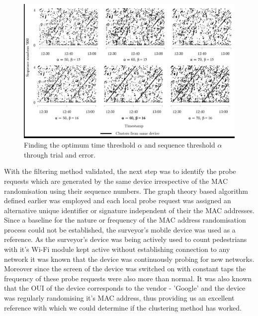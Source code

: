 \begin{figure}
  \includegraphics[trim={1 1 1 1},clip]{images/processing-oxst-clusters.jpg}
  \caption{Finding the optimum time threshold $\alpha$ and sequence threshold $\alpha$ through trial and error.}
  \label{figure:processing:oxst:clusters}
\end{figure}

With the filtering method validated, the next step was to identify the probe requests which are generated by the same device irrespective of the MAC randomisation using their sequence numbers.
The graph theory based algorithm defined earlier was employed and each local probe request was assigned an alternative unique identifier or signature independent of their the MAC addresses.
Since a baseline for the nature or frequency of the MAC address randomisation process could not be established, the surveyor's mobile device was used as a reference.
As the surveyor's device was being actively used to count pedestrians with it's Wi-Fi module kept active without establishing connection to any network it was known that the device was continuously probing for new networks.
Moreover since the screen of the device was switched on with constant taps the frequency of these probe requests were also more than normal.
It was also known that the OUI of the device corresponds to the vendor - 'Google' and the device was regularly randomising it's MAC address, thus providing us an excellent reference with which we could determine if the clustering method has worked.

